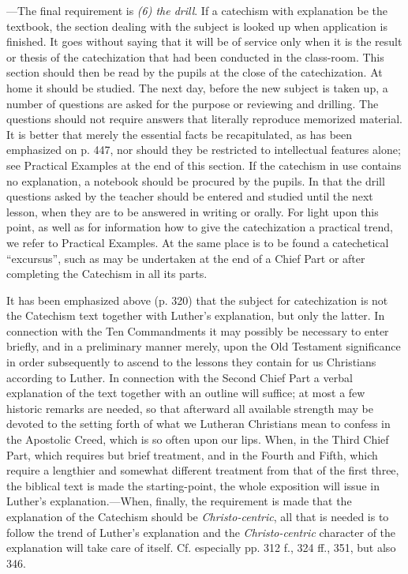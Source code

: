 —The final requirement is \emph{(6) the drill}. If a catechism with explanation be the textbook, the section dealing with the subject is looked up when application is finished. It goes without saying that it will be of service only when it is the result or thesis of the catechization that had been conducted in the class-room. This section should then be read by the pupils at the close of the catechization. At home it should be studied. The next day, before the new subject is taken up, a number of questions are asked for the purpose or reviewing and drilling. The questions should not require answers that literally reproduce memorized material. It is better that merely the essential facts be recapitulated, as has been emphasized on p. 447, nor should they be restricted to intellectual features alone; see Practical Examples at the end of this section. If the catechism in use contains no
explanation, a notebook should be procured by the pupils. In that the drill questions asked by the teacher should be entered and studied until the next lesson, when they are to be answered in writing or orally. For light upon this point, as well as for information how to give the catechization a practical trend, we refer to Practical Examples. At the same place is to be found a catechetical “excursus”, such as may be undertaken at the end of a Chief Part or after completing the Catechism in all its parts.

It has been emphasized above (p. 320) that the subject for catechization is not the Catechism text together with Luther’s explanation, but only the latter. In connection with the Ten Commandments it may possibly be necessary to enter briefly, and in a preliminary manner merely, upon the Old Testament significance in order subsequently to ascend to the lessons they contain for us Christians according to Luther. In connection with the Second Chief Part a verbal explanation of the text together with an outline will suffice; at most a few historic remarks are needed, so that afterward all available strength may be devoted to the setting forth of what we Lutheran Christians mean to confess in the Apostolic Creed, which is so often upon our lips. When, in the Third Chief Part, which requires but brief treatment, and in the Fourth and Fifth, which require a lengthier and somewhat different treatment from that of the first three, the biblical text is made the starting-point, the whole exposition will issue in Luther’s explanation.—When, finally, the requirement is made that the explanation of the Catechism should be \emph{Christo-centric}, all that is needed is to follow the trend of Luther’s explanation and the \emph{Christo-centric} character of the explanation will take care of itself. Cf. especially pp. 312 f., 324 ff., 351, but also 346.
